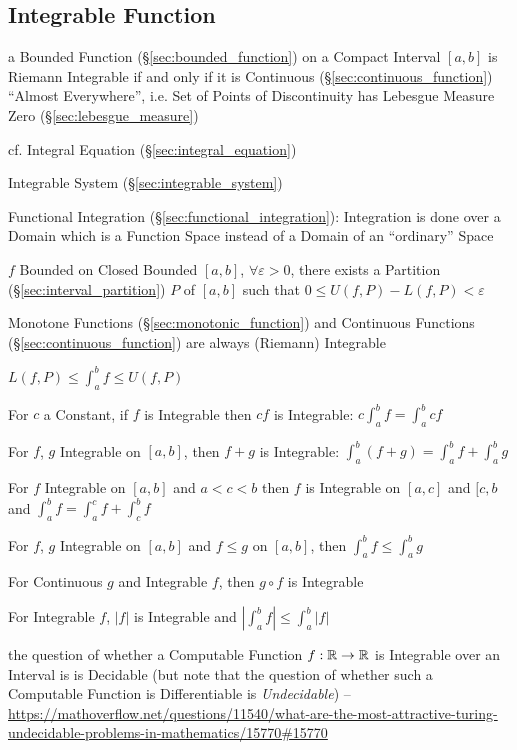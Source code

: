 {%
\subsection{Integrable Function}\label{sec:integrable_function}


a Bounded Function (\S\ref{sec:bounded_function}) on a Compact Interval $[a,b]$
is Riemann Integrable if and only if it is Continuous
(\S\ref{sec:continuous_function}) ``Almost Everywhere'', i.e. Set of Points of
Discontinuity has Lebesgue Measure Zero (\S\ref{sec:lebesgue_measure})

cf. Integral Equation (\S\ref{sec:integral_equation})

\fist Integrable System (\S\ref{sec:integrable_system})

\fist Functional Integration (\S\ref{sec:functional_integration}): Integration
is done over a Domain which is a Function Space instead of a Domain of an
``ordinary'' Space

$f$ Bounded on Closed Bounded $[a,b]$, $\forall \varepsilon >0$, there
exists a Partition (\S\ref{sec:interval_partition}) $P$ of $[a,b]$
such that $0 \leq U(f,P) - L(f,P) < \varepsilon$ %

Monotone Functions (\S\ref{sec:monotonic_function}) and Continuous
Functions (\S\ref{sec:continuous_function}) are always (Riemann)
Integrable

$L(f,P) \leq \int_a^b f \leq U(f,P)$

For $c$ a Constant, if $f$ is Integrable then $cf$ is Integrable: $c
\int_a^b f = \int_a^b c f$

For $f$, $g$ Integrable on $[a,b]$, then $f + g$ is Integrable:
$\int_a^b (f+g) = \int_a^b f + \int_a^b g$

For $f$ Integrable on $[a,b]$ and $a < c < b$ then $f$ is Integrable
on $[a,c]$ and $[c,b$ and $\int_a^b f = \int_a^c f + \int_c^b f$

For $f$, $g$ Integrable on $[a,b]$ and $f \leq g$ on $[a,b]$, then
$\int_a^b f \leq \int_a^b g$

For Continuous $g$ and Integrable $f$, then $g \circ f$ is Integrable

For Integrable $f$, $|f|$ is Integrable and $|\int_a^b f| \leq
\int_a^b |f|$

the question of whether a Computable Function $f : \mathbb{R} \to \mathbb{R}$ is
Integrable over an Interval is is Decidable (but note that the question of
whether such a Computable Function is Differentiable is \emph{Undecidable})
--\url{https://mathoverflow.net/questions/11540/what-are-the-most-attractive-turing-undecidable-problems-in-mathematics/15770#15770}



}
